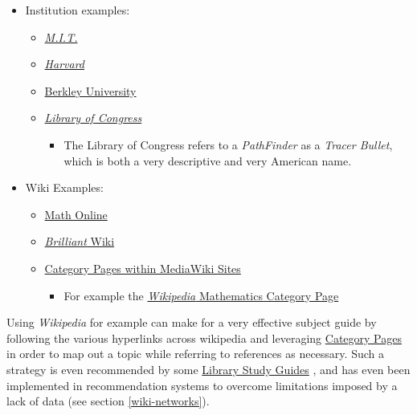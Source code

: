 \documentclass[11pt]{article}
\begin{document}
\begin{itemize}
\item Institution examples:
\begin{itemize}
\item \href{https://libraries.mit.edu/experts/}{\emph{M.I.T.}} \cite{mitResearchGuidesExpert}
\item \href{https://guides.library.harvard.edu/}{\emph{Harvard}} \cite{harvarduniversityResearchGuides}
\item \href{https://www.lib.berkeley.edu/libraries/business-library}{Berkley University} \cite{berkleyuniversityBusinessLibraryUC}
\item \href{https://www.loc.gov/rr/scitech/tracer-bullets/}{\emph{Library of Congress}} \cite{ScienceTracerBullets}
\begin{itemize}
\item The Library of Congress refers to a \emph{PathFinder} as a \emph{Tracer Bullet}, which is both a very descriptive and very American name.
\end{itemize}
\end{itemize}
\item Wiki Examples:
\begin{itemize}
\item \href{http://mathonline.wikidot.com/}{Math Online}  \cite{Mathonline}
\item \href{https://brilliant.org/wiki/best/}{\emph{Brilliant} Wiki} \cite{Top100Wiki}
\item \href{https://www.mediawiki.org/wiki/Help:Categories}{Category Pages within MediaWiki Sites} \cite{HelpCategoriesMediaWiki}
\begin{itemize}
\item For example the \href{https://en.wikipedia.org/wiki/Category:Mathematics}{\emph{Wikipedia} Mathematics Category Page} \cite{CategoryMathematics2019}
\end{itemize}
\end{itemize}
\end{itemize}

Using \emph{Wikipedia} for example can make for a very effective subject guide by
following the various hyperlinks across wikipedia and leveraging \href{https://www.mediawiki.org/wiki/Help:Categories}{Category Pages}
\cite{HelpCategoriesMediaWiki} in order to map out a topic while referring to
references as necessary. Such a strategy is even recommended by some \href{https://mville.libguides.com/c.php?g=370066\&p=2500344}{Library
Study Guides} \cite{moskowitzLibraryGuidesWikipedia}, and has even been implemented
in recommendation systems to overcome limitations imposed by a lack of data
\cite{loizouUsingWikipediaAlleviate2010a} (see section \ref{wiki-networks}).
\end{document}
